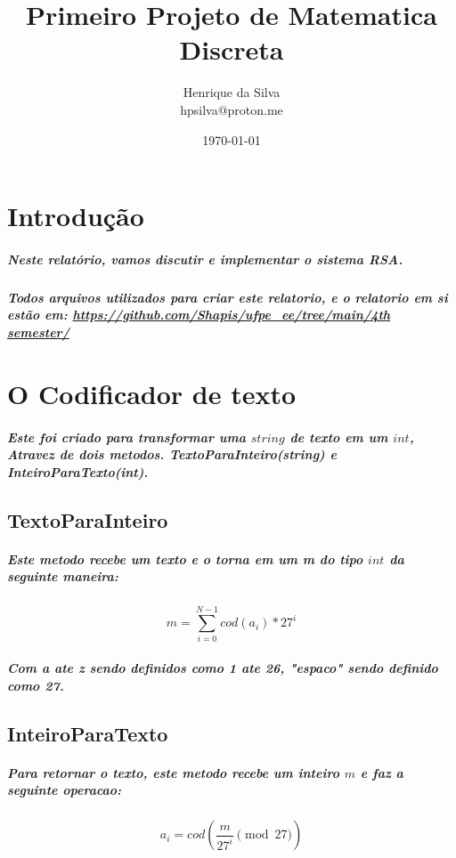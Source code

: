 \documentclass[12pt,twoside, a4paper, twocolumn]{article}
\title{Primeiro Projeto de Matematica Discreta}
\author{Henrique da Silva \\ hpsilva@proton.me}
\date{\today}
\begin{document}
\maketitle
{}
\newpage
\tableofcontents
\newpage



\section{Introdução}


\subparagraph*{Neste relatório, vamos discutir e implementar o sistema RSA.}

\subparagraph*{Todos arquivos utilizados para criar este relatorio, e o relatorio em si estão em:  \url{https://github.com/Shapis/ufpe_ee/tree/main/4th semester/}}

\section{O Codificador de texto}

\subparagraph*{Este foi criado para transformar uma $string$ de texto em um $int$, Atravez de dois metodos. TextoParaInteiro(string) e InteiroParaTexto(int). }

\subsection{TextoParaInteiro}

\subparagraph*{Este metodo recebe um texto e o torna em um m do tipo $int$ da seguinte maneira:}

\begin{equation}
    m = \sum_{i=0}^{N - 1} cod(a_i)*27^i
\end{equation}

\subparagraph*{Com \emph{a} ate \emph{z} sendo definidos como 1 ate 26, "espaco" sendo definido como 27.}

\subsection{InteiroParaTexto}

\subparagraph*{Para retornar o texto, este metodo recebe um inteiro $m$ e faz a seguinte operacao:}

\begin{equation}
    a_i    = cod\left(\frac{m}{27^i} \pmod{27}\right)
\end{equation}
\end{document}
